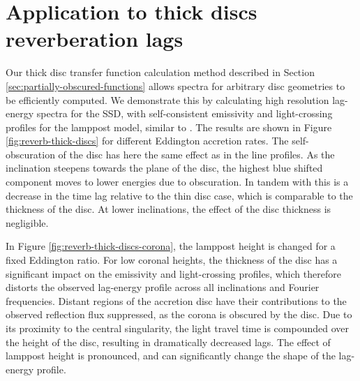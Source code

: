 \documentclass[fleqn,usenatbib]{mnras}
\begin{document}
\section{Application to thick discs reverberation lags}
\label{sec:applications}

Our thick disc transfer function calculation method described in Section
\ref{sec:partially-obscured-functions} allows spectra for arbitrary disc
geometries to be efficiently computed. We demonstrate this by calculating high
resolution lag-energy spectra for the SSD, with self-consistent emissivity and
light-crossing profiles for the lamppost model, similar to
\citet{taylor_x-ray_2018_reverb}. The results are shown in Figure
\ref{fig:reverb-thick-discs} for different Eddington accretion rates. The
self-obscuration of the disc has here the same effect as in the line profiles.
As the inclination steepens towards the plane of the disc, the highest blue
shifted component moves to lower energies due to obscuration. In tandem with
this is a decrease in the time lag relative to the thin disc case, which is
comparable to the thickness of the disc. At lower inclinations, the effect of
the disc thickness is negligible.

In Figure \ref{fig:reverb-thick-discs-corona}, the lamppost height is changed
for a fixed Eddington ratio. For low coronal heights, the thickness of the disc
has a significant impact on the emissivity and light-crossing profiles, which
therefore distorts the observed lag-energy profile across all inclinations and
Fourier frequencies. Distant regions of the accretion disc have their
contributions to the observed reflection flux suppressed, as the corona is
obscured by the disc. Due to its proximity to the central singularity, the
light travel time is compounded over the height of the disc, resulting in
dramatically decreased lags. The effect of lamppost height is pronounced, and can
significantly change the shape of the lag-energy profile.
\end{document}
